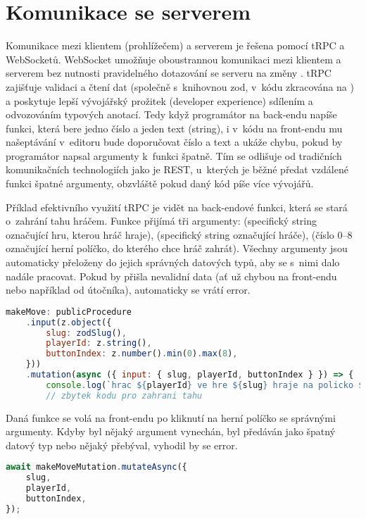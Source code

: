 \section{Komunikace se serverem}

Komunikace mezi klientem (prohlížečem) a serverem je řešena pomocí tRPC a
WebSocketů. WebSocket umožňuje oboustrannou komunikaci mezi klientem a serverem
bez nutnosti pravidelného dotazování se serveru na změny \cite{mdn-ws}. tRPC
zajišťuje validaci a čtení dat (společně s~knihovnou zod, v~kódu zkracována na
) a poskytuje lepší vývojářský prožitek (developer experience) sdílením a
odvozováním typových anotací. Tedy když programátor na back-endu napíše funkci,
která bere jedno číslo a jeden text (string), i v~kódu na front-endu mu
našeptávání v~editoru bude doporučovat číslo a text a ukáže chybu, pokud by
programátor napsal argumenty k~funkci špatně. Tím se odlišuje od tradičních
komunikačních technologiích jako je REST, u~kterých je běžné předat vzdálené
funkci špatné argumenty, obzvláště pokud daný kód píše více vývojářů.

Příklad efektivního využití tRPC je vidět na back-endové funkci, která se stará
o~zahrání tahu hráčem. Funkce přijímá tři argumenty:  (specifický
string označující hru, kterou hráč hraje),  (specifický string
označující hráče),  (číslo 0--8 označující herní políčko, do
kterého chce hráč zahrát). Všechny argumenty jsou automaticky přeloženy do
jejich správných datových typů, aby se s~nimi dalo nadále pracovat. Pokud by
přišla nevalidní data (ať už chybou na front-endu nebo například od útočníka),
automaticky se vrátí error.

\begin{lstlisting}[language=JavaScript,caption={Funkce pro zahrání tahu},label={fig:be-make-move}]
makeMove: publicProcedure
    .input(z.object({
        slug: zodSlug(),
        playerId: z.string(),
        buttonIndex: z.number().min(0).max(8),
    }))
    .mutation(async ({ input: { slug, playerId, buttonIndex } }) => {
        console.log(`hrac ${playerId} ve hre ${slug} hraje na policko ${buttonIndex}`);
        // zbytek kodu pro zahrani tahu
\end{lstlisting}

Daná funkce se volá na front-endu po kliknutí na herní políčko se správnými
argumenty. Kdyby byl nějaký argument vynechán, byl předáván jako špatný datový
typ nebo nějaký přebýval, vyhodil by se error.

\begin{lstlisting}[language=JavaScript,caption={Volání funkce pro zahrání tahu},label={lst:make-move}]
await makeMoveMutation.mutateAsync({
    slug,
    playerId,
    buttonIndex,
});
\end{lstlisting}

